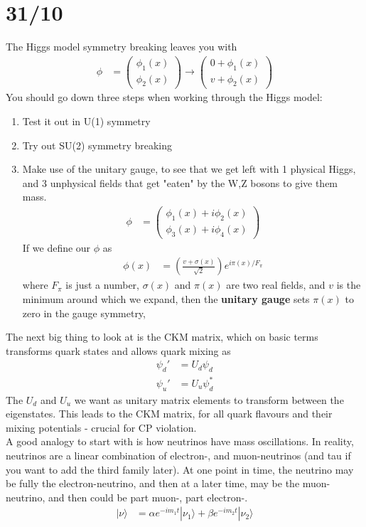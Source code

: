 \documentclass[a4paper, 11pt, normalem]{article}
\begin{document}
\section*{31/10}
The Higgs model symmetry breaking leaves you with
\begin{align}
    \phi &= \begin{pmatrix} \phi_1(x) \\ \phi_2(x)\end{pmatrix} \to \begin{pmatrix} 0 + \phi_1(x) \\ v+\phi_2(x)\end{pmatrix}
\end{align}
You should go down three steps when working through the Higgs model:
\begin{enumerate}
    \item Test it out in U(1) symmetry
    \item Try out SU(2) symmetry breaking
    \item Make use of the unitary gauge, to see that we get left with 1 physical Higgs, and 3 unphysical fields that get "eaten" by the W,Z bosons to give them mass. 
        \begin{align}
            \phi &= \begin{pmatrix} \phi_1(x)+i\phi_2(x) \\\phi_3(x)+i\phi_4(x)\end{pmatrix}
        \end{align}
        If we define our $\phi$ as
        \begin{align}
            \phi(x) &= \left(\frac{v+\sigma(x)}{\sqrt{2}}\right)e^{i\pi(x)/F_{\pi}}
        \end{align}
        where $F_\pi$ is just a number, $\sigma(x)$ and $\pi(x)$ are two real fields, and $v$ is the minimum around which we expand, then the \textbf{unitary gauge} sets $\pi(x)$ to zero in the gauge symmetry,
\end{enumerate}

The next big thing to look at is the CKM matrix, which on basic terms transforms quark states and allows quark mixing as
\begin{align}
    \psi_d' &= U_d\psi_d \\
    \psi_u' &= U_u\psi_d^*
\end{align}
The $U_d$ and $U_u$ we want as unitary matrix elements to transform between the eigenstates. 
This leads to the CKM matrix, for all quark flavours and their mixing potentials - crucial for CP violation. \\
A good analogy to start with is how neutrinos have mass oscillations. 
In reality, neutrinos are a linear combination of electron-, and muon-neutrinos (and tau if you want to add the third family later). 
At one point in time, the neutrino may be fully the electron-neutrino, and then at a later time, may be the muon-neutrino, and then could be part muon-, part electron-. 
\begin{align}
    |\nu\rangle &= \alpha e^{-im_1t}|\nu_1\rangle + \beta e^{-im_2t}|\nu_2\rangle
\end{align} 
\end{document}
